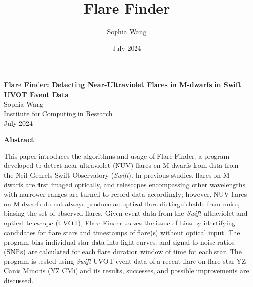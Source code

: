 \documentclass{article}
\title{Flare Finder}
\author{Sophia Wang}
\date{July 2024}
\begin{document}
\begin{center}
    \Large
    \textbf{Flare Finder: Detecting Near-Ultraviolet Flares in M-dwarfs in Swift UVOT Event Data} \\
    \vspace{1cm}
    \large
    Sophia Wang \\
    Institute for Computing in Research \\
    July 2024 \\
    \vspace{1cm}
    
    \Large
    \textbf{Abstract}
    
\end{center}
This paper introduces the algorithms and usage of Flare Finder, a program developed to detect near-ultraviolet (NUV) flares on M-dwarfs from data from the Neil Gehrels Swift Observatory (\textit{Swift}). In previous studies, flares on M-dwarfs are first imaged optically, and telescopes encompassing other wavelengths with narrower ranges are turned to record data accordingly; however, NUV flares on M-dwarfs do not always produce an optical flare distinguishable from noise, biasing the set of observed flares. Given event data from the \textit{Swift} ultraviolet and optical telescope (UVOT), Flare Finder solves the issue of bias by identifying candidates for flare stars and timestamps of flare(s) without optical input. The program bins individual star data into light curves, and signal-to-noise ratios (SNRs) are calculated for each flare duration window of time for each star. The program is tested using \textit{Swift} UVOT event data of a recent flare on flare star YZ Canis Minoris (YZ CMi) and its results, successes, and possible improvements are discussed.

\vspace{1cm}
\end{document}
